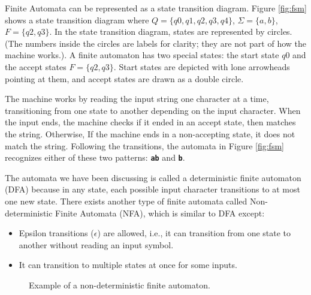 Finite Automata can be represented as a state transition diagram. Figure \ref{fig:fsm} shows a state transition diagram where $Q = \{q0, q1, q2, q3, q4\}$, $\Sigma = \{a, b\}$, $F = \{q2, q3\}$. In the state transition diagram, states are represented by circles. (The numbers inside the circles are labels for clarity; they are not part of how the machine works.). A finite automaton has two special states: the start state $q0$ and the accept states $F = \{q2, q3\}$. Start states are depicted with lone arrowheads pointing at them, and accept states are drawn as a double circle.

The machine works by reading the input string one character at a time, transitioning from one state to another depending on the input character. When the input ends, the machine checks if it ended in an accept state, then matches the string. Otherwise, If the machine ends in a non-accepting state, it does not match the string. Following the transitions, the automata in Figure \ref{fig:fsm} recognizes either of these two patterns: \texttt{\textbf{ab}} and \texttt{\textbf{b}}.

The automata we have been discussing is called a deterministic finite automaton (DFA) because in any state, each possible input character transitions to at most one new state. There exists another type of finite automata called Non-deterministic Finite Automata (NFA), which is similar to DFA except:

\begin{itemize}
    \item Epsilon transitions ($\epsilon$) are allowed, i.e., it can transition from one state to another without reading an input symbol.
    \item It can transition to multiple states at once for some inputs.
\end{itemize}

\begin{figure}[H]
\centering
{}
\caption{Example of a non-deterministic finite automaton.}\label{fig:nfafsm}
\end{figure}

